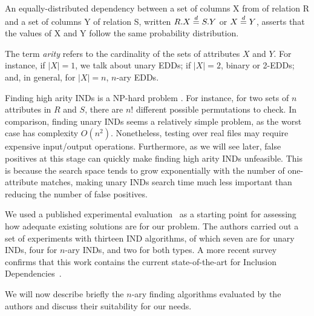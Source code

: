 \begin{definition}
An equally-distributed dependency between a set of columns X from
of relation R and a set of columns Y of relation S, written $R.X \stackrel{d}{=} S.Y$ or
$X \stackrel{d}{=} Y$, asserts that the values of X and Y follow the same probability distribution.
\label{def:eqdist}
\end{definition}

The term \emph{arity} refers to the cardinality of the sets of attributes $X$ and $Y$. For instance, if $|X| = 1$, we talk about unary \glspl{EDD}; if $|X| = 2$,
binary or 2-\glspl{EDD}; and, in general, for $|X| = n$, $n$-ary \glspl{EDD}.

Finding high arity \glspl{IND} is a NP-hard problem \cite{kantola1992}.
For instance, for two sets of $n$ attributes in $R$ and $S$,
there are $n!$ different possible permutations to check.
In comparison, finding unary \glspl{IND} seems a relatively simple problem,
as the worst case has complexity $O(n^2)$. Nonetheless,
testing over real files may require expensive input/output operations.
Furthermore, as we will see later, false positives at this stage can quickly make
finding high arity \glspl{IND} unfeasible. This is because the search space tends to grow exponentially
with the number of one-attribute matches, making unary \glspl{IND} search time much less important
than reducing the number of false positives.

We used a published experimental evaluation~\cite{Dursch2019} as a starting point for
assessing how adequate existing solutions are for our problem. The authors carried out a
set of experiments with thirteen \gls{IND} algorithms, of which seven are for unary \glspl{IND},
four for $n$-ary \glspl{IND}, and two for both types. A more recent survey confirms that this
work contains the current state-of-the-art for Inclusion
Dependencies~\cite{kossmann_data_2022}.

We will now describe briefly the $n$-ary finding
algorithms evaluated by the authors and discuss their suitability for our needs.

